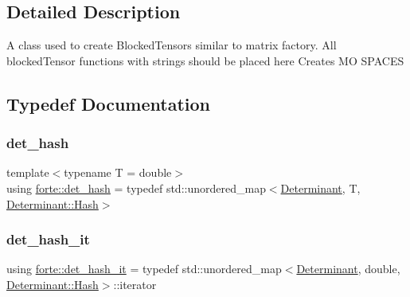 \subsection{Detailed Description}
A class used to create Blocked\+Tensors similar to matrix factory. All blocked\+Tensor functions with strings should be placed here Creates MO S\+P\+A\+C\+ES 

\subsection{Typedef Documentation}
\mbox{\label{namespaceforte_a47c4b5da48301071e46f500b6a674d7b}} 
\subsubsection{\texorpdfstring{det\+\_\+hash}{det\_hash}}
{\footnotesize\ttfamily template$<$typename T  = double$>$ \\
using \mbox{\hyperlink{namespaceforte_a47c4b5da48301071e46f500b6a674d7b}{forte\+::det\+\_\+hash}} = typedef std\+::unordered\+\_\+map$<$\mbox{\hyperlink{namespaceforte_a2076c63fd7b8732004d9e1442ce527c1}{Determinant}}, T, \mbox{\hyperlink{structforte_1_1_bit_array_1_1_hash}{Determinant\+::\+Hash}}$>$}

\mbox{\label{namespaceforte_a8c024ae1d9bb8c77b3d77b8e3a14d036}} 
\subsubsection{\texorpdfstring{det\+\_\+hash\+\_\+it}{det\_hash\_it}}
{\footnotesize\ttfamily using \mbox{\hyperlink{namespaceforte_a8c024ae1d9bb8c77b3d77b8e3a14d036}{forte\+::det\+\_\+hash\+\_\+it}} = typedef std\+::unordered\+\_\+map$<$\mbox{\hyperlink{namespaceforte_a2076c63fd7b8732004d9e1442ce527c1}{Determinant}}, double, \mbox{\hyperlink{structforte_1_1_bit_array_1_1_hash}{Determinant\+::\+Hash}}$>$\+::iterator}

\mbox{\label{namespaceforte_aee00ff2f656f0aa613d3f9f1ba01cad5}} 
